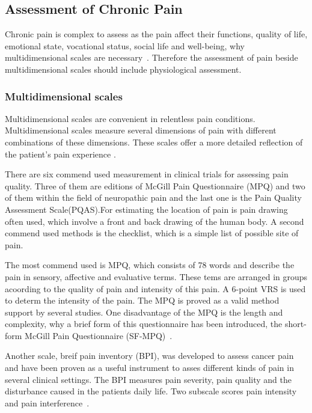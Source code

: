 \subsection{Assessment of Chronic Pain}
Chronic pain is complex to assess as the pain affect their functions, quality of life, emotional state, vocational status, social life and well-being, why multidimensional scales are necessary~\cite{Ebert2010}. Therefore the assessment of pain beside multidimensional scales should include physiological assessment.

\subsubsection{Multidimensional scales}
Multidimensional scales are convenient in relentless pain conditions. Multidimensional scales measure several dimensions of pain with different combinations of these dimensions. These scales offer a more detailed reflection of the patient's pain experience \cite{Briggs2010}. 

There are six commend used measurement in clinical trials for assessing pain quality. Three of them are editions of McGill Pain Questionnaire (MPQ) and two of them within the field of neuropathic pain and the last one is the Pain Quality Assessment Scale(PQAS).For estimating the location of pain is pain drawing often used, which involve a front and back drawing of the human body. A second commend used methods is the checklist, which is a simple list of possible site of pain.~\cite{Jensen2001} 

The most commend used is MPQ, which consists of 78 words and describe the pain in sensory, affective and evaluative terms. These tems are arranged in groups acoording to the quality of pain and intensity of this pain. A 6-point VRS is used to determ the intensity of the pain. The MPQ is proved as a valid method support by several studies. One disadvantage of the MPQ is the length and complexity, why a brief form of this questionnaire has been introduced, the short-form McGill Pain Questionnaire (SF-MPQ)~\cite{Katz2001}. 

Another scale, breif pain inventory (BPI), was developed to assess cancer pain and have been proven as a useful instrument to asses different kinds of pain in several clinical settings. The BPI measures pain severity, pain quality and the disturbance caused in the patients daily life. Two subscale scores pain intensity and pain interference~\cite{Katz2001}.  

